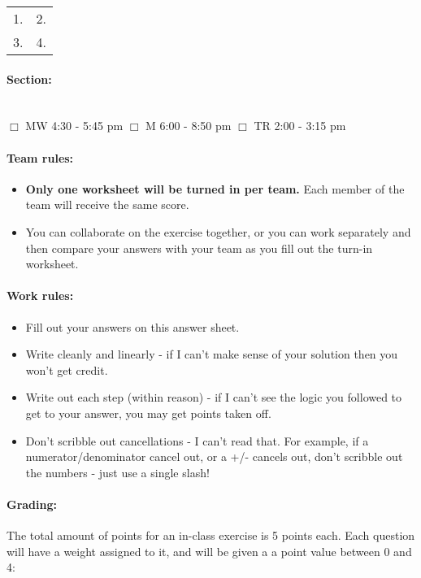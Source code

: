 \documentclass[a4paper,12pt]{book}
\begin{document}
    \begin{tabular}{ p{6cm} p{6cm} }
        1. & 2. \\
        3. & 4.
    \end{tabular}

    \paragraph{Section:} ~\\
        $\Box$ MW 4:30 - 5:45 pm \tab
        $\Box$ M 6:00 - 8:50 pm \tab
        $\Box$ TR 2:00 - 3:15 pm

    \paragraph{Team rules:}

    \begin{itemize}
        \item \textbf{Only one worksheet will be turned in per team.}
            Each member of the team will receive the same score.
        \item You can collaborate on the exercise together, or you can
            work separately and then compare your answers with your team
            as you fill out the turn-in worksheet.
    \end{itemize}

    \paragraph{Work rules:}

    \begin{itemize}
        \item Fill out your answers on this answer sheet.
        \item Write cleanly and linearly - if I can't make sense of
            your solution then you won't get credit.
        \item Write out each step (within reason) - if I can't see the
            logic you followed to get to your answer, you may get points taken off.
        \item Don't scribble out cancellations - I can't read that.
            For example, if a numerator/denominator cancel out, or a +/-
            cancels out, don't scribble out the numbers - just use a single slash!
    \end{itemize}

    \paragraph{Grading:}
        The total amount of points for an in-class exercise is 5 points each.
        Each question will have a weight assigned to it, and will be given
        a a point value between 0 and 4:
\end{document}
